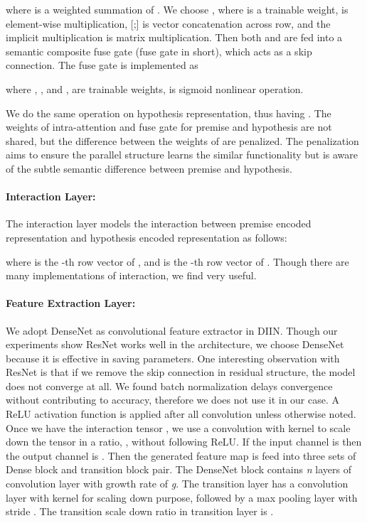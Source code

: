 \documentclass{article} \usepackage{iclr2018_conference,times}
\begin{document}
where  is a weighted summation of . We choose , where  is a trainable weight,  is element-wise multiplication, [;] is vector concatenation across row, and the implicit multiplication is matrix multiplication. Then both  and  are fed into a semantic composite fuse gate (fuse gate in short), which acts as a skip connection. The fuse gate is implemented as 



where , ,  and  ,  are trainable weights,  is sigmoid nonlinear operation. 

We do the same operation on hypothesis representation, thus having . The weights of intra-attention and fuse gate for premise and hypothesis are not shared, but the difference between the weights of are penalized. The penalization aims to ensure the parallel structure learns the similar functionality but is aware of the subtle semantic difference between premise and hypothesis.


\paragraph{Interaction Layer: } The interaction layer models the interaction between premise encoded representation  and hypothesis encoded representation  as follows:


where  is the -th row vector of , and  is the -th row vector of . Though there are many implementations of interaction, we find  very useful.

\paragraph{Feature Extraction Layer: } We adopt DenseNet\citep{DenseNet_Huang:2016wa} as convolutional feature extractor in DIIN. Though our experiments show ResNet\citep{ResNet_He:2016tt} works well in the architecture, we choose DenseNet because it is effective in saving parameters. One interesting observation with ResNet is that if we remove the skip connection in residual structure, the model does not converge at all. We found batch normalization delays convergence without contributing to accuracy, therefore we does not use it in our case. A ReLU activation function is applied after all convolution unless otherwise noted. Once we have the interaction tensor , we use a convolution with  kernel to scale down the tensor in a ratio, , without following ReLU. If the input channel is  then the output channel is . Then the generated feature map is feed into three sets of Dense block\citep{DenseNet_Huang:2016wa} and transition block pair. The DenseNet block contains \textit{n} layers of  convolution layer with growth rate of \textit{g}. The transition layer has a convolution layer with  kernel for scaling down purpose, followed by a max pooling layer with stride . The transition scale down ratio in transition layer is .
\end{document}
